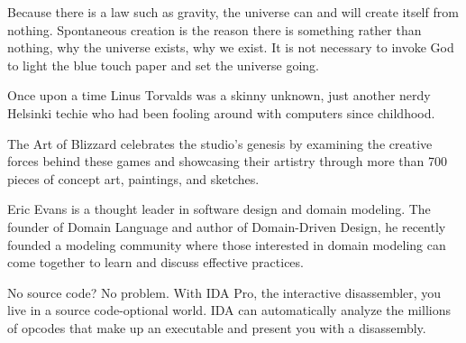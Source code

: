 \documentclass{article}
\begin{document}
Because there is a law such as gravity, the universe can and will create itself from nothing. Spontaneous creation is the reason there is something rather than nothing, why the universe exists, why we exist. It is not necessary to invoke God to light the blue touch paper and set the universe going. \cite{Hawking2010Grand}

Once upon a time Linus Torvalds was a skinny unknown, just another nerdy Helsinki techie who had been fooling around with computers since childhood. \cite{Torvalds2001Just}

The Art of Blizzard celebrates the studio's genesis by examining the creative forces behind these games and showcasing their artistry through more than 700 pieces of concept art, paintings, and sketches. \cite{Entertainment2011Art}

Eric Evans is a thought leader in software design and domain modeling. The founder of Domain Language and author of Domain-Driven Design, he recently founded a modeling community where those interested in domain modeling can come together to learn and discuss effective practices. \cite{Evans2003Domain}

No source code? No problem. With IDA Pro, the interactive disassembler, you live in a source code-optional world. IDA can automatically analyze the millions of opcodes that make up an executable and present you with a disassembly. \cite{Eagle2011IDA}

\printbibliography
\end{document}
